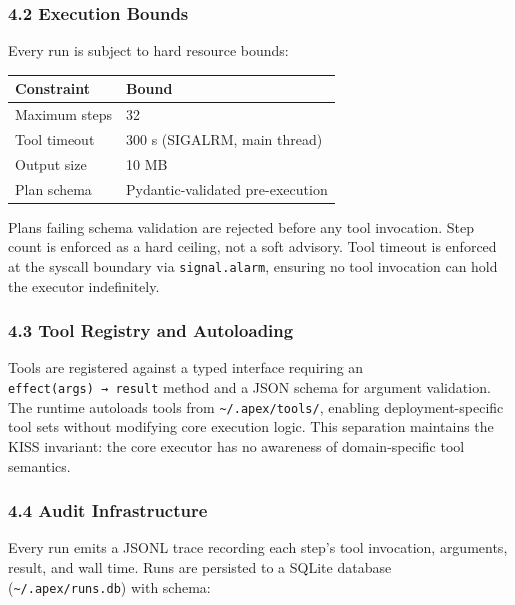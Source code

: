\subsubsection{4.2 Execution Bounds}\label{execution-bounds}

Every run is subject to hard resource bounds:

\begin{longtable}[]{@{}ll@{}}
\toprule\noalign{}
Constraint & Bound \\
\midrule\noalign{}
\endhead
\bottomrule\noalign{}
\endlastfoot
Maximum steps & 32 \\
Tool timeout & 300 s (SIGALRM, main thread) \\
Output size & 10 MB \\
Plan schema & Pydantic-validated pre-execution \\
\end{longtable}

Plans failing schema validation are rejected before any tool invocation.
Step count is enforced as a hard ceiling, not a soft advisory. Tool
timeout is enforced at the syscall boundary via \texttt{signal.alarm},
ensuring no tool invocation can hold the executor indefinitely.

\subsubsection{4.3 Tool Registry and
Autoloading}\label{tool-registry-and-autoloading}

Tools are registered against a typed interface requiring an
\texttt{effect(args)\ →\ result} method and a JSON schema for argument
validation. The runtime autoloads tools from
\texttt{\textasciitilde{}/.apex/tools/}, enabling deployment-specific
tool sets without modifying core execution logic. This separation
maintains the KISS invariant: the core executor has no awareness of
domain-specific tool semantics.

\subsubsection{4.4 Audit Infrastructure}\label{audit-infrastructure}

Every run emits a JSONL trace recording each step's tool invocation,
arguments, result, and wall time. Runs are persisted to a SQLite
database (\texttt{\textasciitilde{}/.apex/runs.db}) with schema:

\begin{Shaded}
\begin{Highlighting}[]
\NormalTok{)}
\NormalTok{(}\NormalTok{)}
\end{Highlighting}
\end{Shaded}

